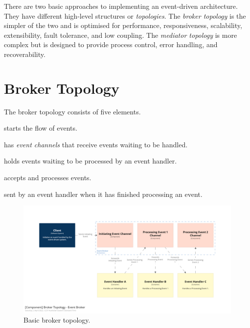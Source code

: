 There are two basic approaches to implementing an event-driven architecture.
They have different high-level structures or \emph{topologies}.
The \emph{broker topology} is the simpler of the two and is optimised for performance, responsiveness, scalability, extensibility, fault tolerance, and low coupling.
The \emph{mediator topology} is more complex but is designed to provide process control, error handling, and recoverability.


\section{Broker Topology}

The broker topology consists of five elements.

\begin{description}[topsep=6pt,partopsep=2pt,itemsep=4pt,parsep=4pt]
    \item[Initiating Event] starts the flow of events.
    \item[Event Broker] has \emph{event channels} that receive events waiting to be handled.
    \item[Event Channel] holds events waiting to be processed by an event handler.
    \item[Event Handler] accepts and processes events.
    \item[Processing Event] sent by an event handler when it has finished processing an event.
\end{description}

\begin{figure}[h!]
    \begin{adjustwidth}{-10mm}{-10mm}
        \centering
        \includegraphics[trim=195 195 195 195,clip,width=0.97\paperwidth]{diagrams/broker-components.png}
    \end{adjustwidth}
    \caption{Basic broker topology.}
    \label{fig:broker-components}
\end{figure}

